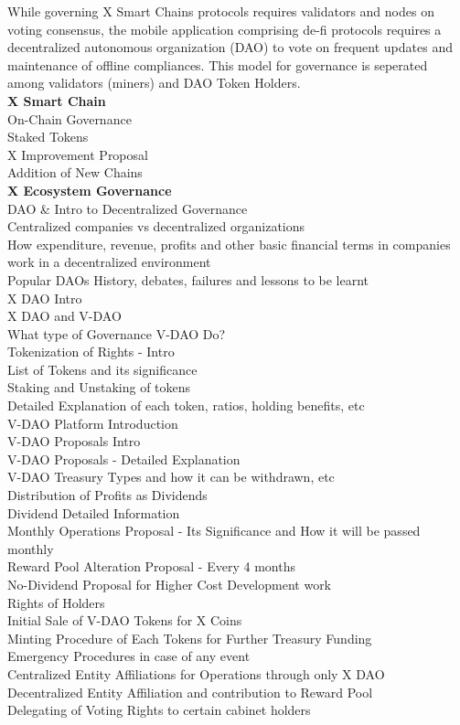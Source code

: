 \documentclass[letterpaper,11pt]{article}
\begin{document}
While governing X Smart Chains protocols requires validators and nodes on voting consensus, the mobile application comprising de-fi protocols requires a decentralized autonomous organization (DAO) to vote on frequent updates and maintenance of offline compliances. This model for governance is seperated among validators (miners) and DAO Token Holders.\\


\textbf{X Smart Chain}\\

On-Chain Governance\\
Staked Tokens\\
X Improvement Proposal\\
Addition of New Chains\\

\textbf{X Ecosystem Governance}\\

DAO \& Intro to Decentralized Governance\\
Centralized companies vs decentralized organizations\\
How expenditure, revenue, profits and other basic financial terms in companies work in a decentralized environment\\
Popular DAOs History, debates, failures and lessons to be learnt\\
X DAO Intro\\
X DAO and V-DAO\\
What type of Governance V-DAO Do?\\
Tokenization of Rights - Intro\\
List of Tokens and its significance\\
Staking and Unstaking of tokens\\
Detailed Explanation of each token, ratios, holding benefits, etc\\
V-DAO Platform Introduction\\
V-DAO Proposals Intro\\
V-DAO Proposals - Detailed Explanation\\
V-DAO Treasury Types and how it can be withdrawn, etc\\
Distribution of Profits as Dividends\\
Dividend Detailed Information\\
Monthly Operations Proposal - Its Significance and How it will be passed monthly\\
Reward Pool Alteration Proposal - Every 4 months\\
No-Dividend Proposal for Higher Cost Development work\\
Rights of Holders\\
Initial Sale of V-DAO Tokens for X Coins\\
Minting Procedure of Each Tokens for Further Treasury Funding\\
Emergency Procedures in case of any event\\
Centralized Entity Affiliations for Operations through only X DAO\\
Decentralized Entity Affiliation  and contribution to Reward Pool\\
Delegating of Voting Rights to certain cabinet holders\\
\end{document}
